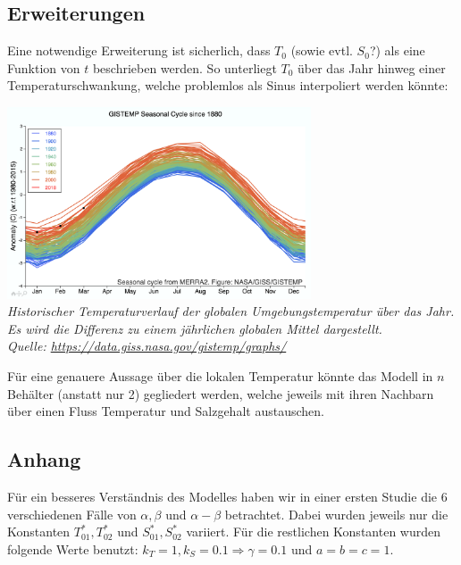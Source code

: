 \documentclass[10pt,a4paper]{article}
\begin{document}
	\newpage
	\subsection*{Erweiterungen}
	
	Eine notwendige Erweiterung ist sicherlich, dass \(T_0\) (sowie evtl. \(S_0\)?) als eine Funktion von \(t\) beschrieben werden. So unterliegt \(T_0\) über das Jahr hinweg einer Temperaturschwankung, welche problemlos als Sinus interpoliert werden könnte:
	
	\begin{center}
	\includegraphics[width=9cm]{Diagramme/GISTEMP.png} \\
	\textit{Historischer Temperaturverlauf der globalen Umgebungstemperatur über das Jahr. Es wird die Differenz zu einem jährlichen globalen Mittel dargestellt.  \\
	Quelle: \url{https://data.giss.nasa.gov/gistemp/graphs/}}
	\end{center}	
	
	Für eine genauere Aussage über die lokalen Temperatur könnte das Modell in \(n\) Behälter (anstatt nur 2) gegliedert werden, welche jeweils mit ihren Nachbarn über einen Fluss Temperatur und Salzgehalt austauschen.
	
	\newpage
	\subsection*{Anhang}
	
	Für ein besseres Verständnis des Modelles haben wir in einer ersten Studie die 6 verschiedenen Fälle von \(\alpha, \beta \) und \(\alpha - \beta\) betrachtet. Dabei wurden jeweils nur die Konstanten \(T^*_{01}, T^*_{02}\) und \(S^*_{01}, S^*_{02}\) variiert. Für die restlichen Konstanten wurden folgende Werte benutzt: \(k_T = 1, k_S = 0.1 \Rightarrow \gamma = 0.1\) und \(a = b = c = 1 \). 
	
\end{document}
